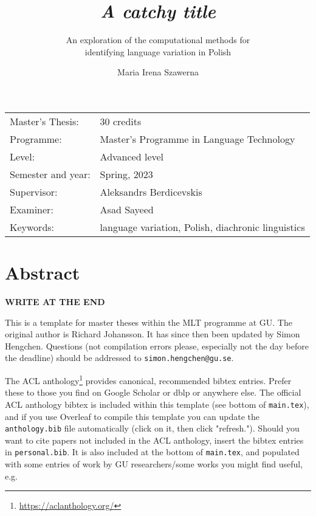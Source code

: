 \documentclass[12pt, a4paper]{article}  %
\title{\textit{A catchy title}}  %
\subtitle{An exploration of the computational methods for \\ identifying language variation in Polish}
\author{Maria Irena Szawerna}
\begin{document}
\begin{titlepage}

\maketitle

\vfill

\begingroup
\renewcommand*{\arraystretch}{1.2}
\begin{tabular}{l@{\hskip 20mm}l}
\hline
Master's Thesis: & 30 credits \\
Programme: & Master’s Programme in Language Technology\\
Level: & Advanced level \\
Semester and year: & Spring, 2023 \\
Supervisor: & Aleksandrs Berdicevskis \\
Examiner: & Asad Sayeed \\ %
Keywords: & language variation, Polish, diachronic linguistics %
\end{tabular}
\endgroup

\thispagestyle{empty}
\end{titlepage}

\newpage
\singlespacing
\section*{Abstract}

\textbf{WRITE AT THE END}

This is a template for master theses within the MLT programme at GU. The original author is Richard Johansson. It has since then been updated by Simon Hengchen. Questions (not compilation errors please, especially not the day before the deadline) should be addressed to \texttt{simon.hengchen@gu.se}.

The ACL anthology\footnote{\url{https://aclanthology.org/}} provides canonical, recommended bibtex entries. Prefer these to those you find on Google Scholar or dblp or anywhere else. The official ACL anthology bibtex is included within this template (see bottom of \texttt{main.tex}), and if you use Overleaf to compile this template you can update the \texttt{anthology.bib} file automatically (click on it, then click "refresh."). Should you want to cite papers not included in the ACL anthology, insert the bibtex entries in \texttt{personal.bib}. It is also included at the bottom of \texttt{main.tex}, and populated with some entries of work by GU researchers/some works you might find useful, e.g.
\end{document}
